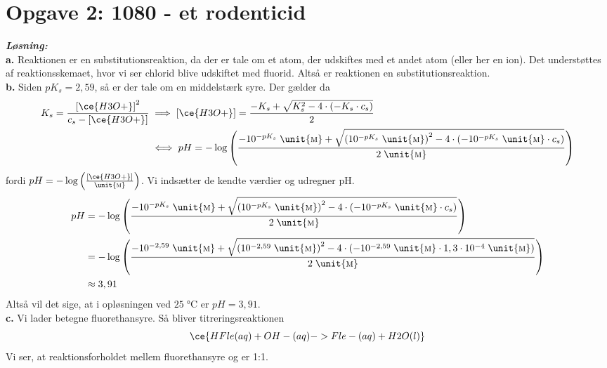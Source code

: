 \documentclass{report}
\newcommand{\sol}{\setlength{\parindent}{0cm}\textbf{\textit{Løsning:}}\setlength{\parindent}{1cm}}
\begin{document}
\section*{Opgave 2: 1080 - et rodenticid}
\sol \\
\textbf{a.}
Reaktionen er en substitutionsreaktion, da der er tale om et atom, der udskiftes med et andet atom (eller her en ion).
Det understøttes af reaktionsskemaet, hvor vi ser chlorid blive udskiftet med fluorid.
Altså er reaktionen en substitutionsreaktion.\\[1ex]
\textbf{b.}
Siden $pK_s=2,59$, så er der tale om en middelstærk syre.
Der gælder da
\begin{equation*}
\begin{split}
K_s=\frac{\left[\ce{H3O+} \right]^2}{c_s-\left[\ce{H3O+} \right]} &\implies \left[\ce{H3O+} \right]=\frac{-K_s + \sqrt{K_s^2 - 4 \cdot \left(-K_s \cdot c_s\right) } }{2}\\
  &\iff pH=- \log\left(\frac{-10 ^{-pK_s} \;\unit{\textsc{m}} + \sqrt{\left(10 ^{-pK_s}\;\unit{\textsc{m}} \right)^2 - 4 \cdot \left(-10 ^{-pK_s} \;\unit{\textsc{m}} \cdot c_s\right) } }{2 \;\unit{\textsc{m}} }\right) 
\end{split}
\end{equation*}
fordi $pH=-\log\left(\frac{[\ce{H3O+} ]}{\unit{\textsc{m}}}\right) $.
Vi indsætter de kendte værdier og udregner pH.
\begin{equation*}
\begin{split}
  pH&=- \log\left(\frac{-10 ^{-pK_s} \;\unit{\textsc{m}}  + \sqrt{\left(10 ^{-pK_s} \;\unit{\textsc{m}} \right)^2 - 4 \cdot \left(-10 ^{-pK_s} \;\unit{\textsc{m}} \cdot c_s\right) } }{2 \;\unit{\textsc{m}} }\right) \\
  &=-\log\left(\frac{-10^{-2,59}\;\unit{\textsc{m}} + \sqrt{\left(10^{-2,59}\;\unit{\textsc{m}}\right)^2-4 \cdot \left(-10^{-2,59}\;\unit{\textsc{m}} \cdot 1,3 \cdot 10 ^{-4} \;\unit{\textsc{m}} \right) } }{2 \;\unit{\textsc{m}} }\right) \\
  &\approx 3,91
\end{split}
\end{equation*}
Altså vil det sige, at i opløsningen ved $25 \;\unit{\celsius} $ er $pH=3,91$. \\[1ex]
\textbf{c.}
Vi lader  betegne fluorethansyre.
Så bliver titreringsreaktionen
\[
\ce{HFle(aq) + OH-(aq) -> Fle-(aq) + H2O(l)}
\] 
Vi ser, at reaktionsforholdet mellem fluorethansyre og  er 1:1.
\end{document}
